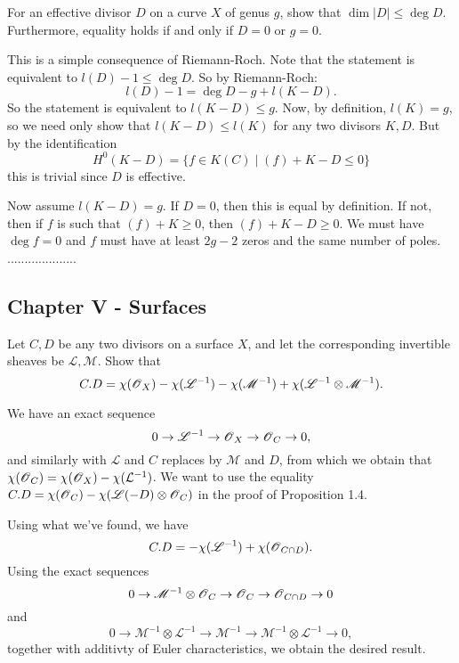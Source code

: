 \documentclass[11pt, english]{article}
\begin{document}
\begin{exc}[Exercise 1.5]
For an effective divisor $D$ on a curve $X$ of genus $g$, show that $\dim \lvert D \rvert \leq \deg D$. Furthermore, equality holds if and only if $D=0$ or $g=0$. 
\end{exc}
\begin{sol}
This is a simple consequence of Riemann-Roch. Note that the statement is equivalent to $l(D) - 1 \leq \deg D$. So by Riemann-Roch:
\[
l(D)-1 = \deg D - g + l(K-D).
\]
So the statement is equivalent to $l(K-D) \leq g$. Now, by definition, $l(K)=g$, so we need only show that $l(K-D) \leq l(K)$ for any two divisors $K,D$. But by the identification
$$
H^0(K-D)=\{ f \in K(C) \mid (f) + K-D \leq 0 \}
$$
this is trivial since $D$ is effective.

Now assume $l(K-D)=g$. If $D=0$, then this is equal by definition. If not, then if $f$ is such that $(f) + K \geq 0$, then $(f) + K-D \geq 0$. We must have $\deg f = 0$ and $f$ must have at least $2g-2$ zeros and the same number of poles. ....................
\end{sol}

\subsection{Chapter V - Surfaces}

\begin{exc}[Exercise 1.1]
Let $C,D$ be any two divisors on a surface $X$, and let the corresponding invertible sheaves be $\mathscr L, \mathscr M$. Show that
\[
C.D = \chi(\operatorname{\mathscr{O}}_X) -\chi(\mathscr L^{-1})-\chi(\mathscr M^{-1})+\chi(\mathscr L^{-1} \otimes \mathscr M^{-1}).
\]
\end{exc}

\begin{sol}
We have an exact sequence
\[
0 \to \mathscr L^{-1} \to \operatorname{\mathscr{O}}_X \to \operatorname{\mathscr{O}}_C \to 0,
\]
and similarly with $\mathscr L$ and $C$ replaces by $\mathscr M$ and  $D$, from which we obtain that $\chi(\operatorname{\mathscr{O}}_C) = \chi(\operatorname{\mathscr{O}}_X)-\chi(\mathcal{L}^{-1})$. We want to use the equality $C.D = \chi(\operatorname{\mathscr{O}}_C)- \chi(\mathscr L(-D) \otimes \operatorname{\mathscr{O}}_C)$ in the proof of Proposition 1.4.

Using what we've found, we have
$$
C.D = -\chi(\mathscr L^{-1}) + \chi ( \operatorname{\mathscr{O}}_{C \cap D}).
$$
Using the exact sequences 
\[
0 \to \mathscr M^{-1} \otimes \operatorname{\mathscr{O}}_C \to \operatorname{\mathscr{O}}_C \to \operatorname{\mathscr{O}}_{C \cap D} \to 0
\]
and 
\[
0 \to \mathscr M^{-1} \otimes \mathscr L^{-1} \to \mathscr M^{-1} \to \mathscr M^{-1} \otimes \mathscr L^{-1} \to 0,
\]
together with additivty of Euler characteristics, we obtain the desired result.
\end{sol}
\end{document}
